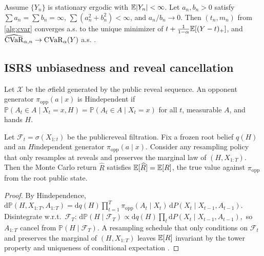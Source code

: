 \begin{proposition}\label{prop:sa}
Assume $\{Y_n\}$ is stationary ergodic with $\mathbb{E}|Y_n|<\infty$. Let $a_n,b_n>0$ satisfy $\sum a_n=\sum b_n=\infty$, $\sum (a_n^2+b_n^2)<\infty$, and $a_n/b_n\to 0$. Then $(t_n,m_n)$ from \cref{alg:cvar} converges a.s. to the unique minimizer of $t+\frac{1}{1-\alpha}\mathbb{E}[(Y-t)_+]$, and $\widehat{\mathrm{CVaR}}_{\alpha,n}\to \mathrm{CVaR}_\alpha(Y)$ a.s. \cite{rockafellar2000cvar,borkar2008sa,kushner2003sa}.
\end{proposition}

\subsection{IS\textendash RS unbiasedness and reveal cancellation}
\begin{definition}
Let $\mathcal{X}$ be the $\sigma$\textendash field generated by the public reveal sequence. An opponent generator $\pi_{\mathrm{opp}}(a\mid x)$ is H\textendash independent if $\mathbb{P}(A_t\in A\mid X_t=x,H)=\mathbb{P}(A_t\in A\mid X_t=x)$ for all $t$, measurable $A$, and hands $H$.
\end{definition}

\begin{lemma}\label{lem:isrs}
Let $\mathcal{F}_t=\sigma(X_{1:t})$ be the public\textendash reveal filtration. Fix a frozen root belief $q(H)$ and an $H$\textendash independent generator $\pi_{\mathrm{opp}}(a\mid x)$. Consider any resampling policy that only resamples at reveals and preserves the marginal law of $(H,X_{1:T})$. Then the Monte Carlo return $\widehat{R}$ satisfies $\mathbb{E}[\widehat{R}]=\mathbb{E}[R]$, the true value against $\pi_{\mathrm{opp}}$ from the root public state.
\end{lemma}
\begin{proof}
By H\textendash independence,
$
\mathrm{d}\mathbb{P}(H,X_{1:T},A_{1:T})=\mathrm{d}q(H)\prod_{t=1}^T \pi_{\mathrm{opp}}(A_t\mid X_t)\,\mathrm{d}P(X_t\mid X_{t-1},A_{t-1}).
$
Disintegrate w.r.t.\ $\mathcal{F}_T$:
$
\mathrm{d}\mathbb{P}(H\mid \mathcal{F}_T)\propto \mathrm{d}q(H)\prod_t \mathrm{d}P(X_t\mid X_{t-1},A_{t-1}),
$
so $A_{1:T}$ cancel from $\mathbb{P}(H\mid \mathcal{F}_T)$. A resampling schedule that only conditions on $\mathcal{F}_t$ and preserves the marginal of $(H,X_{1:T})$ leaves $\mathbb{E}[R]$ invariant by the tower property and uniqueness of conditional expectation \cite{kallenberg2002fmp}.
\end{proof}

